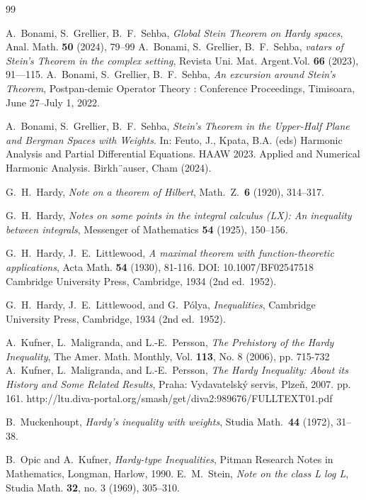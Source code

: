 \documentclass[12pt,a4paper]{amsart}
\theoremstyle{definition}
\begin{document}
\begin{thebibliography}{99}

A.~Bonami, S.~Grellier, B.~F.~Sehba, 
\textit{Global Stein Theorem on Hardy spaces}, Anal.
Math. \textbf{50} (2024), 79–99
A.~Bonami, S.~Grellier, B.~F.~Sehba, 
\textit{vatars of Stein’s Theorem in the complex setting},
Revista Uni. Mat. Argent.Vol. \textbf{66} (2023), 91—115. 
A.~Bonami, S.~Grellier, B.~F.~Sehba, 
\textit{An excursion around Stein’s Theorem}, Postpan-demic Operator Theory : Conference Proceedings, Timisoara, June 27–July 1, 2022.

A.~Bonami, S.~Grellier, B.~F.~Sehba, 
\textit{Stein’s Theorem in the Upper-Half Plane and
Bergman Spaces with Weights}. In: Feuto, J., Kpata, B.A. (eds) Harmonic Analysis and Partial
Differential Equations. HAAW 2023. Applied and Numerical Harmonic Analysis. Birkh¨auser,
Cham (2024).


G.~H.~Hardy,
\textit{Note on a theorem of Hilbert},
Math.\ Z.\ \textbf{6} (1920), 314--317.

G.~H.~Hardy,
\textit{Notes on some points in the integral calculus (LX):
An inequality between integrals},
Messenger of Mathematics \textbf{54} (1925), 150--156.

G.~H.~Hardy, J.~E.~Littlewood,
\textit{A maximal theorem with function-theoretic applications},  Acta Math. {\bf 54} (1930), 81-116. DOI: 10.1007/BF02547518 
Cambridge University Press, Cambridge, 1934 (2nd ed.\ 1952).


G.~H.~Hardy, J.~E.~Littlewood, and G.~P\'olya,
\textit{Inequalities},
Cambridge University Press, Cambridge, 1934 (2nd ed.\ 1952).

A.~Kufner, L.~Maligranda, and L.-E.~Persson,
\textit{The Prehistory of the Hardy Inequality},
The Amer. Math. Monthly, Vol. \textbf{113}, No. 8 (2006), pp. 715-732
A.~Kufner, L.~Maligranda, and L.-E.~Persson,
\textit{The Hardy Inequality: About its History and Some Related Results}, Praha:
Vydavatelsk\'y servis, Plze\v{n}, 2007. pp. 161. http://ltu.diva-portal.org/smash/get/diva2:989676/FULLTEXT01.pdf

B.~Muckenhoupt,
\textit{Hardy's inequality with weights},
Studia Math.\ \textbf{44} (1972), 31--38.

B.~Opic and A.~Kufner,
\textit{Hardy-type Inequalities},
Pitman Research Notes in Mathematics, Longman, Harlow, 1990.
E.~M.~Stein,
\textit{Note on the class L log L}, Studia Math. \textbf{ 32}, no. 3 (1969), 305–310.
\end{thebibliography}
\end{document}

